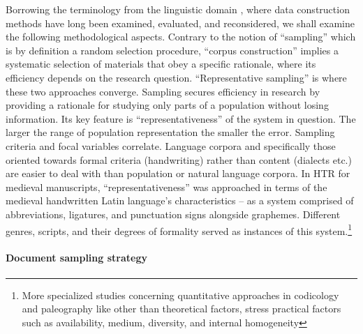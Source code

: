 \documentclass{article}
\begin{document}
Borrowing the terminology from the linguistic domain \citep{bauer2000corpus}, where data construction methods have long been examined, evaluated, and reconsidered, we shall examine the following methodological aspects. Contrary to the notion of \enquote{sampling} which is by definition a random selection procedure, \enquote{corpus construction} implies a systematic selection of materials that obey a specific rationale, where its efficiency depends on the research question. \enquote{Representative sampling} is where these two approaches converge.
Sampling secures efficiency in research by providing a rationale for studying only parts of a population without losing information. Its key feature is \enquote{representativeness} of the system in question. The larger the range of population representation the smaller the error. Sampling criteria and focal variables correlate. Language corpora and specifically those oriented towards formal criteria (handwriting) rather than content (dialects etc.) are easier to deal with than population or natural language corpora. In HTR for medieval manuscripts, \enquote{representativeness} was approached in terms of the medieval handwritten Latin language's characteristics -- as a system comprised of abbreviations, ligatures, and punctuation signs alongside graphemes. Different genres, scripts, and their degrees of formality served as instances of this system.\footnote{More specialized studies concerning quantitative approaches in codicology and paleography like \citep{maniaci1993che} other than theoretical factors, stress practical factors such as availability, medium, diversity, and internal homogeneity}  

\paragraph{Document sampling strategy}
\end{document}
